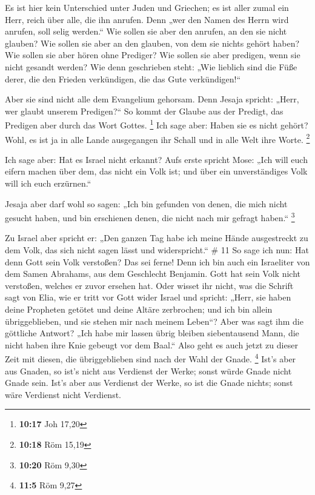  Es ist hier kein Unterschied unter Juden und Griechen;
es ist aller zumal ein Herr, reich über alle, die ihn anrufen.
 Denn „wer den Namen des Herrn wird anrufen, soll selig
werden.``  Wie sollen sie aber den anrufen, an den sie
nicht glauben? Wie sollen sie aber an den glauben, von dem sie nichts
gehört haben? Wie sollen sie aber hören ohne Prediger? 
Wie sollen sie aber predigen, wenn sie nicht gesandt werden? Wie denn
geschrieben steht: „Wie lieblich sind die Füße derer, die den Frieden
verkündigen, die das Gute verkündigen!{}``

 Aber sie sind nicht alle dem Evangelium gehorsam. Denn
Jesaja spricht: „Herr, wer glaubt unserem Predigen?{}`` 
So kommt der Glaube aus der Predigt, das Predigen aber durch das Wort
Gottes. \footnote{\textbf{10:17} Joh 17,20}  Ich sage
aber: Haben sie es nicht gehört? Wohl, es ist ja in alle Lande
ausgegangen ihr Schall und in alle Welt ihre Worte. \footnote{\textbf{10:18}
  Röm 15,19}

 Ich sage aber: Hat es Israel nicht erkannt? Aufs erste
spricht Mose: „Ich will euch eifern machen über dem, das nicht ein Volk
ist; und über ein unverständiges Volk will ich euch erzürnen.``

 Jesaja aber darf wohl so sagen: „Ich bin gefunden von
denen, die mich nicht gesucht haben, und bin erschienen denen, die nicht
nach mir gefragt haben.`` \footnote{\textbf{10:20} Röm 9,30}

 Zu Israel aber spricht er: „Den ganzen Tag habe ich
meine Hände ausgestreckt zu dem Volk, das sich nicht sagen lässt und
widerspricht.`` \# 11  So sage ich nun: Hat denn Gott sein
Volk verstoßen? Das sei ferne! Denn ich bin auch ein Israeliter von dem
Samen Abrahams, aus dem Geschlecht Benjamin.  Gott hat
sein Volk nicht verstoßen, welches er zuvor ersehen hat. Oder wisset ihr
nicht, was die Schrift sagt von Elia, wie er tritt vor Gott wider Israel
und spricht:  „Herr, sie haben deine Propheten getötet und
deine Altäre zerbrochen; und ich bin allein übriggeblieben, und sie
stehen mir nach meinem Leben``?  Aber was sagt ihm die
göttliche Antwort? „Ich habe mir lassen übrig bleiben siebentausend
Mann, die nicht haben ihre Knie gebeugt vor dem Baal.`` 
Also geht es auch jetzt zu dieser Zeit mit diesen, die übriggeblieben
sind nach der Wahl der Gnade. \footnote{\textbf{11:5} Röm 9,27}
 Ist's aber aus Gnaden, so ist's nicht aus Verdienst der
Werke; sonst würde Gnade nicht Gnade sein. Ist's aber aus Verdienst der
Werke, so ist die Gnade nichts; sonst wäre Verdienst nicht Verdienst.

